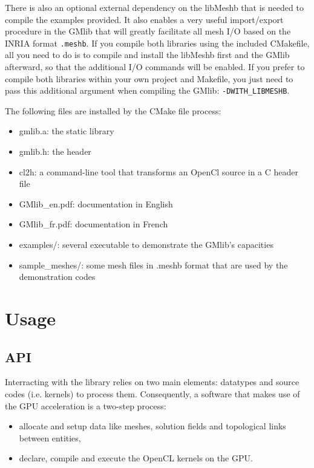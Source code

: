 \documentclass[a4paper,12pt]{article}
\begin{document}
There is also an optional external dependency on the libMeshb that is needed to compile the examples provided.
It also enables a very useful import/export procedure in the GMlib that will greatly facilitate all mesh I/O based on the INRIA format {\tt *.meshb}.
If you compile both libraries using the included CMakefile, all you need to do is to compile and install the libMeshb first and the GMlib afterward, so that the additional I/O commands will be enabled.
If you prefer to compile both libraries within your own project and Makefile, you just need to pass this additional argument when compiling the GMlib: {\tt -DWITH\_LIBMESHB}.
\medskip

The following files are installed by the CMake file process:

\begin{itemize}
   \item gmlib.a: the static library
   \item gmlib.h: the header
   \item cl2h: a command-line tool that transforms an OpenCl source in a C header file
   \item GMlib\_en.pdf: documentation in English
   \item GMlib\_fr.pdf: documentation in French
   \item examples/: several executable to demonstrate the GMlib's capacities
   \item sample\_meshes/: some mesh files in .meshb format that are used by the demonstration codes
\end{itemize}


%
%

\section{Usage}

\subsection{API}
\label{sec:API}
Interracting with the library relies on two main elements: datatypes and source codes (i.e. kernels) to process them. Consequently, a software that makes use of the GPU acceleration is a two-step process:
\medskip

\begin{itemize}
\item allocate and setup data like meshes, solution fields and topological links between entities,
\item declare, compile and execute the OpenCL kernels on the GPU.
\end{itemize}
\medskip
\end{document}
